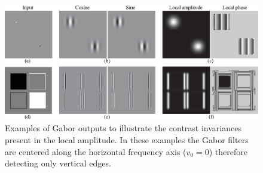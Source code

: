\begin{figure}[t]
	\centerline{
		\includegraphics[width=1\linewidth]{figures/spatial_filter_sets/gabor_quad_examples.eps}
	}
	\caption{Examples of Gabor outputs to illustrate the contrast invariances present in the local amplitude. In these examples the Gabor filters are centered along the horizontal frequency axis ($v_0=0$) therefore detecting only vertical edges.}
	\label{fig:quad3}
\end{figure}




